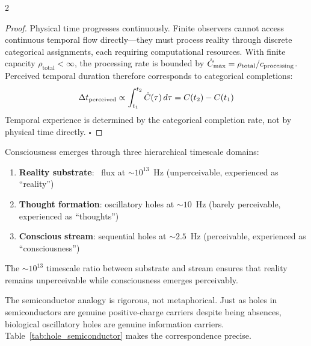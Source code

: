 \begin{multicols}{2}
\begin{proof}
Physical time progresses continuously.  Finite observers cannot access
continuous temporal flow directly---they must process reality through discrete
categorical assignments, each requiring computational resources.  With finite
capacity $\rho_{\text{total}} < \infty$, the processing rate is bounded by
$\dot{C}_{\max} = \rho_{\text{total}}/c_{\text{processing}}$.  Perceived
temporal duration therefore corresponds to categorical completions:
\begin{equation}
\Delta t_{\text{perceived}} \propto \int_{t_1}^{t_2} \dot{C}(\tau)\,d\tau
  = C(t_2) - C(t_1)
\end{equation}
Temporal experience is determined by the categorical completion rate, not
by physical time directly. $\square$
\end{proof}

\begin{theorem}
\label{thm:three_level}
Consciousness emerges through three hierarchical timescale domains:
\begin{enumerate}
\item \textbf{Reality substrate}: \Hplus\ flux at ${\sim}10^{13}$~Hz
  (unperceivable, experienced as ``reality'')
\item \textbf{Thought formation}: oscillatory holes at ${\sim}10$~Hz
  (barely perceivable, experienced as ``thoughts'')
\item \textbf{Conscious stream}: sequential holes at ${\sim}2.5$~Hz
  (perceivable, experienced as ``consciousness'')
\end{enumerate}
The ${\sim}10^{13}$ timescale ratio between substrate and stream ensures that
reality remains unperceivable while consciousness emerges perceivably.
\end{theorem}

The semiconductor analogy is rigorous, not metaphorical.  Just as holes in
semiconductors are genuine positive-charge carriers despite being absences,
biological oscillatory holes are genuine information carriers.
Table~\ref{tab:hole_semiconductor} makes the correspondence precise.

\end{multicols}

